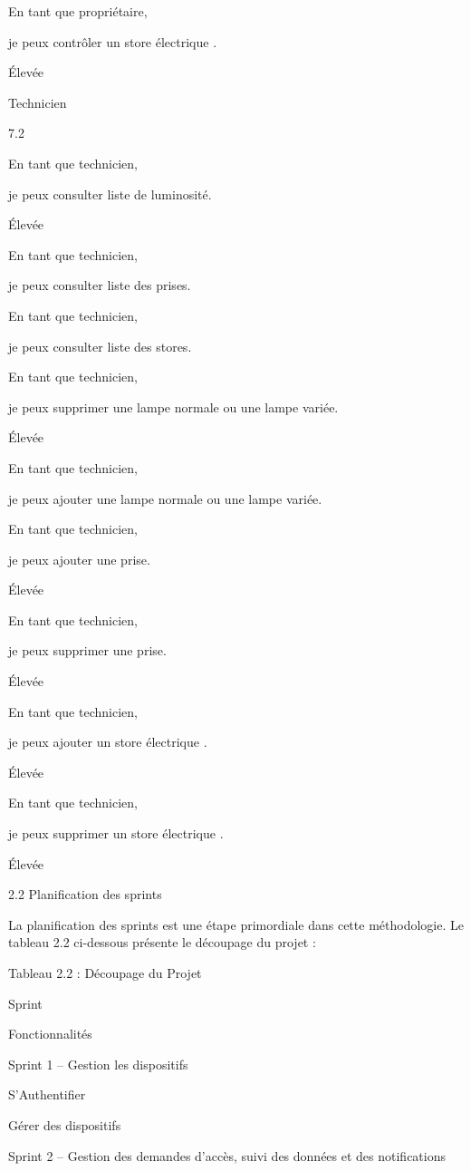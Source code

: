 \documentclass{article}
\begin{document}
En tant que propriétaire,

je peux contrôler   un store électrique .

Élevée

Technicien

7.2

En tant que technicien,

je peux consulter  liste de  luminosité.

Élevée

En tant que technicien,

je peux consulter  liste des  prises.

En tant que technicien,

je peux consulter  liste des stores.

En tant que technicien,

je peux supprimer  une lampe normale ou  une lampe variée.

Élevée

En tant que technicien,

je peux ajouter  une lampe normale ou  une lampe variée.

En tant que technicien,

je peux ajouter  une prise.

Élevée

En tant que technicien,

je peux supprimer  une prise.

Élevée

En tant que technicien,

je peux ajouter  un store électrique .

Élevée

En tant que technicien,

je peux supprimer  un store électrique .

Élevée

2.2 Planification des sprints

La planification des sprints est une étape primordiale dans cette méthodologie. Le tableau 2.2 ci-dessous présente le découpage du projet :

Tableau 2.2 :  Découpage du Projet

Sprint

Fonctionnalités

Sprint 1 – Gestion les dispositifs 

S’Authentifier

Gérer  des dispositifs

Sprint 2 – Gestion des demandes d’accès, suivi des données et des notifications
\end{document}
